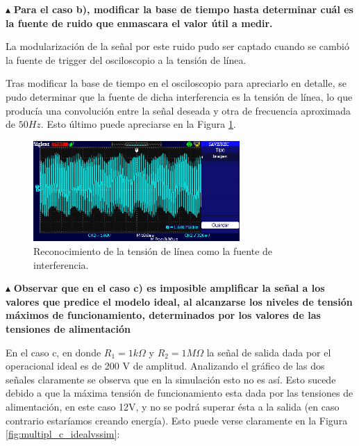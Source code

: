 \noindent$\blacktriangle$\textbf{ Para el caso b), modificar la base de tiempo hasta determinar cuál es la fuente de ruido que enmascara el valor útil a medir.}


La modularización de la señal por este ruido pudo ser captado cuando se cambió la fuente de trigger del osciloscopio a la tensión de línea.

Tras modificar la base de tiempo en el osciloscopio para apreciarlo en detalle, se pudo determinar que la fuente de dicha interferencia es la tensión de línea, lo que producía una convolución entre la señal deseada y otra de frecuencia aproximada de $50Hz$. Esto último puede apreciarse en la Figura \ref{fig:med_amplif_ruido}.

\begin{figure}[h]
  \centering
      \includegraphics[width=0.7\textwidth]{gfxhernan/FIG_MED_Multipl_ruido.png}
  \caption{Reconocimiento de la tensión de línea como la fuente de interferencia.}
  \label{fig:med_amplif_ruido}
\end{figure}

\noindent$\blacktriangle$\textbf{ Observar que en el caso c) es imposible amplificar la señal a los valores que predice el modelo ideal, al alcanzarse los niveles de tensión máximos de funcionamiento, determinados por los valores de las tensiones de alimentación}

En el caso c, en donde $R_{1} = 1 k\Omega$ y $R_{2} = 1 M\Omega$ la señal de salida dada por el operacional ideal es de 200 V de amplitud. Analizando el gráfico de las dos señales claramente se observa que en la simulación esto no es así. Esto sucede debido a que la máxima tensión de funcionamiento esta dada por las tensiones de alimentación, en este caso 12V, y no se podrá superar ésta a la salida (en caso contrario estaríamos creando energía). Esto puede verse claramente en la Figura \ref{fig:multipl_c_idealvssim}:

